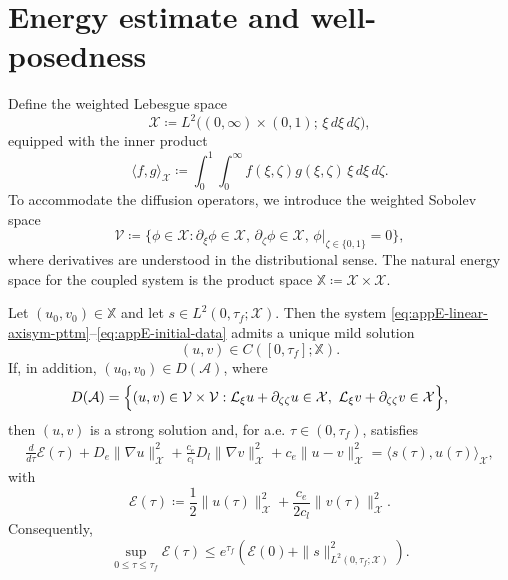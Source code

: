 \section{Energy estimate and well-posedness}
\label{sec:appE-wellposedness}

Define the weighted Lebesgue space
\begin{equation}
    \mathcal{X} \coloneqq L^2\bigl((0,\infty)\times(0,1);\, \xi\, d\xi\, d\zeta\bigr),
    \label{eq:appE-weighted-space}
\end{equation}
equipped with the inner product
\begin{equation}
    \langle f,g\rangle_\mathcal{X} \coloneqq \int_0^1\!\!\int_0^\infty f(\xi,\zeta)g(\xi,\zeta)\,\xi\, d\xi\, d\zeta.
    \label{eq:appE-weighted-inner-product}
\end{equation}
To accommodate the diffusion operators, we introduce the weighted Sobolev space
\begin{equation}
    \mathcal{V} \coloneqq \bigl\{ \phi \in \mathcal{X} : \partial_\xi \phi \in \mathcal{X}, \, \partial_\zeta \phi \in \mathcal{X}, \, \phi|_{\zeta \in \{0,1\}} = 0 \bigr\},
\end{equation}
where derivatives are understood in the distributional sense.
The natural energy space for the coupled system is the product space $\mathbb{X} \coloneqq \mathcal{X} \times \mathcal{X}$.

\begin{theorem}
    \label{thm:appE-energy-estimate}
    Let $(u_0,v_0)\in \mathbb X$ and let $s\in L^2(0,\tau_f;\mathcal X)$.
    Then the system \eqref{eq:appE-linear-axisym-pttm}--\eqref{eq:appE-initial-data}
    admits a unique mild solution
    \[
        (u,v)\in C([0,\tau_f];\mathbb X).
    \]
    If, in addition, $(u_0,v_0)\in D(\mathcal A)$, where
    \[
        D(\mathcal A)
        =
        \Bigl\{(u,v)\in \mathcal V\times\mathcal V:
        \mathcal L_\xi u+\partial_{\zeta\zeta}u\in\mathcal X,\
        \mathcal L_\xi v+\partial_{\zeta\zeta}v\in\mathcal X
        \Bigr\},
    \]
    then $(u,v)$ is a strong solution and, for a.e. $\tau\in(0,\tau_f)$, satisfies
    \begin{align}
        \frac{d}{d\tau}\mathcal E(\tau)
        + D_e\|\nabla u\|_\mathcal X^2
        + \frac{c_e}{c_l}D_l\|\nabla v\|_\mathcal X^2
        + c_e\|u-v\|_\mathcal X^2
        =
        \langle s(\tau),u(\tau)\rangle_\mathcal X,
        \label{eq:appE-energy-identity}
    \end{align}
    with
    \begin{equation}
        \mathcal{E}(\tau) \coloneqq \frac{1}{2}\|u(\tau)\|_\mathcal{X}^2 + \frac{c_e}{2c_l}\|v(\tau)\|_\mathcal{X}^2.
        \label{eq:appE-energy-functional}
    \end{equation}
    Consequently,
    \begin{equation}
        \sup_{0\le \tau\le \tau_f}\mathcal E(\tau)
        \le
        e^{\tau_f}
        \left(
        \mathcal E(0)+\|s\|_{L^2(0,\tau_f;\mathcal X)}^2
        \right).
        \label{eq:appE-energy-bound}
    \end{equation}
\end{theorem}

